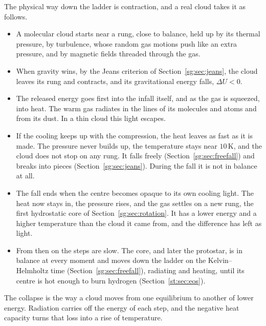 The physical way down the ladder is contraction, and a real cloud takes it as follows.
\begin{itemize}
	\item A molecular cloud starts near a rung, close to balance, held up by its thermal pressure, by turbulence, whose random gas motions push like an extra pressure, and by magnetic fields threaded through the gas.
	\item When gravity wins, by the Jeans criterion of Section~\ref{sg:sec:jeans}, the cloud leaves its rung and contracts, and its gravitational energy falls, $\Delta U<0$.
	\item The released energy goes first into the infall itself, and as the gas is squeezed, into heat. The warm gas radiates in the lines of its molecules and atoms and from its dust. In a thin cloud this light escapes.
	\item If the cooling keeps up with the compression, the heat leaves as fast as it is made. The pressure never builds up, the temperature stays near $10\,\mathrm K$, and the cloud does not stop on any rung. It falls freely (Section~\ref{sg:sec:freefall}) and breaks into pieces (Section~\ref{sg:sec:jeans}). During the fall it is not in balance at all.
	\item The fall ends when the centre becomes opaque to its own cooling light. The heat now stays in, the pressure rises, and the gas settles on a new rung, the first hydrostatic core of Section~\ref{sg:sec:rotation}. It has a lower energy and a higher temperature than the cloud it came from, and the difference has left as light.
	\item From then on the steps are slow. The core, and later the protostar, is in balance at every moment and moves down the ladder on the Kelvin–Helmholtz time (Section~\ref{sg:sec:freefall}), radiating and heating, until its centre is hot enough to burn hydrogen (Section~\ref{st:sec:eos}).
\end{itemize}
The collapse is the way a cloud moves from one equilibrium to another of lower energy. Radiation carries off the energy of each step, and the negative heat capacity turns that loss into a rise of temperature.

